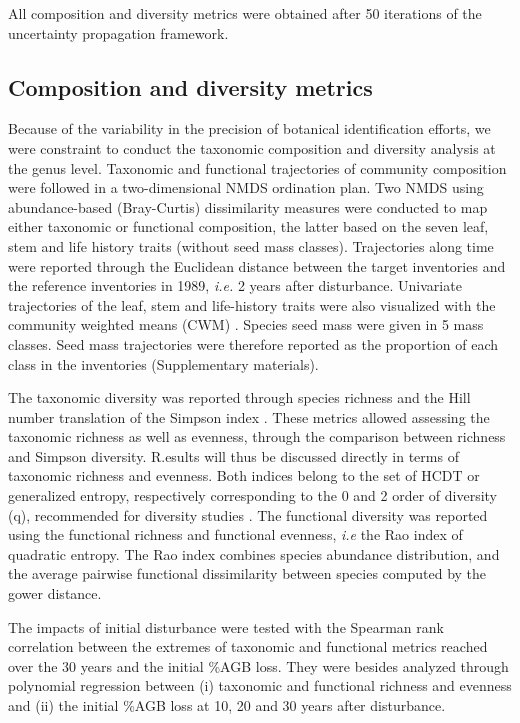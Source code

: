 \documentclass[fleqn,10pt]{ArtEcoFoG} %
\begin{document}
All composition and diversity metrics were obtained after 50 iterations
of the uncertainty propagation framework.

\subsection{Composition and diversity
metrics}\label{composition-and-diversity-metrics}

Because of the variability in the precision of botanical identification
efforts, we were constraint to conduct the taxonomic composition and
diversity analysis at the genus level. Taxonomic and functional
trajectories of community composition were followed in a two-dimensional
NMDS ordination plan. Two NMDS using abundance-based (Bray-Curtis)
dissimilarity measures were conducted to map either taxonomic or
functional composition, the latter based on the seven leaf, stem and
life history traits (without seed mass classes). Trajectories along time
were reported through the Euclidean distance between the target
inventories and the reference inventories in 1989, \emph{i.e.} 2 years
after disturbance. Univariate trajectories of the leaf, stem and
life-history traits were also visualized with the community weighted
means (CWM) \citep{Diaz2007}. Species seed mass were given in 5 mass
classes. Seed mass trajectories were therefore reported as the
proportion of each class in the inventories (Supplementary materials).

The taxonomic diversity was reported through species richness and the
Hill number translation of the Simpson index \citep{Hill1973}. These
metrics allowed assessing the taxonomic richness as well as evenness,
through the comparison between richness and Simpson diversity. R.esults
will thus be discussed directly in terms of taxonomic richness and
evenness. Both indices belong to the set of HCDT or generalized entropy,
respectively corresponding to the 0 and 2 order of diversity (q),
recommended for diversity studies \citep{Marcon2015b}. The functional
diversity was reported using the functional richness and functional
evenness, \emph{i.e} the Rao index of quadratic entropy. The Rao index
combines species abundance distribution, and the average pairwise
functional dissimilarity between species computed by the gower distance.

The impacts of initial disturbance were tested with the Spearman rank
correlation between the extremes of taxonomic and functional metrics
reached over the 30 years and the initial \%AGB loss. They were besides
analyzed through polynomial regression between (i) taxonomic and
functional richness and evenness and (ii) the initial \%AGB loss at 10,
20 and 30 years after disturbance.
\end{document}
